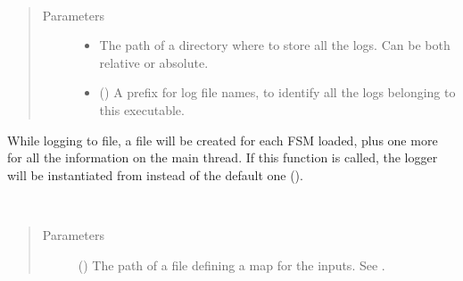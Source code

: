 \documentclass[letterpaper,10pt,english]{sphinxmanual}
\begin{document}
\begin{fulllineitems}
\label{\detokenize{loader:loader.loader.logToFile}}~\begin{quote}\begin{description}
\item[{Parameters}] \leavevmode\begin{itemize}
\item {} 
 \textendash{} The path of a directory where to store all the logs. Can be both relative or absolute.

\item {} 
 () \textendash{} A prefix for log file names, to identify all the logs belonging to this executable.

\end{itemize}

\end{description}\end{quote}

While logging to file, a file will be created for each FSM loaded, plus one
more for all the information on the main thread. If this function is called,
the logger will be instantiated from {\hyperref[\detokenize{logger:fsmFileLogger}]{}} instead of the
default one ({\hyperref[\detokenize{logger:fsmLogger}]{}}).

\end{fulllineitems}


\begin{fulllineitems}
\label{\detokenize{loader:loader.loader.setIoMap}}~\begin{quote}\begin{description}
\item[{Parameters}] \leavevmode
{} () \textendash{} The path of a file defining a map for the inputs. See {\hyperref[\detokenize{io:mappedIOs}]{}}.

\end{description}\end{quote}

\end{fulllineitems}
\end{document}

